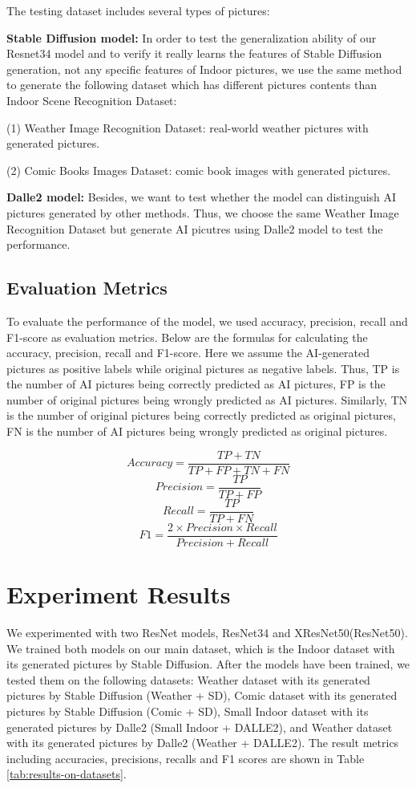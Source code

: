 \documentclass[11pt]{article}
\begin{document}
The testing dataset includes several types of pictures:

\textbf{Stable Diffusion model:} In order to test the generalization ability of our Resnet34 model and to verify it really learns the features of Stable Diffusion generation, not any specific features of Indoor pictures, we use the same method to generate the following dataset which has different pictures contents than Indoor Scene Recognition Dataset:

(1) Weather Image Recognition Dataset: real-world weather pictures with generated pictures.

(2) Comic Books Images Dataset: comic book images with generated pictures.

\textbf{Dalle2 model: } Besides, we want to test whether the model can distinguish AI pictures generated by other methods. Thus, we choose the same Weather Image Recognition Dataset but generate AI picutres using Dalle2 model to test the performance.

\subsection{Evaluation Metrics}

To evaluate the performance of the model, we used accuracy, precision, recall and F1-score as evaluation metrics. Below are the formulas for calculating the accuracy, precision, recall and F1-score. Here we assume the AI-generated pictures as positive labels while original pictures as negative labels. Thus, TP is the number of AI pictures being correctly predicted as AI pictures, FP is the number of original pictures being wrongly predicted as AI pictures. Similarly, TN is the number of original pictures being correctly predicted as original pictures, FN is the number of AI pictures being wrongly predicted as original pictures.

\[
  Accuracy = \frac{TP+TN}{TP+FP+TN+FN}
\]
\[
  Precision = \frac{TP}{TP+FP}
\]
\[
  Recall = \frac{TP}{TP+FN}
\]
\[
  F1 = \frac{2 \times Precision \times Recall}{Precision + Recall}
\]


\section{Experiment Results}

We experimented with two ResNet models, ResNet34 and XResNet50(ResNet50). We trained both models on our main dataset, which is the Indoor dataset with its generated pictures by Stable Diffusion.  After the models have been trained, we tested them on the following datasets: Weather dataset with its generated pictures by Stable Diffusion (Weather + SD), Comic dataset with its generated pictures by Stable Diffusion (Comic + SD), Small Indoor dataset with its generated pictures by Dalle2 (Small Indoor + DALLE2), and Weather dataset with its generated pictures by Dalle2 (Weather + DALLE2). The result metrics including accuracies, precisions, recalls and F1 scores are shown in Table \ref{tab:results-on-datasets}.
\end{document}
